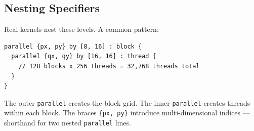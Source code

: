 \subsection*{Nesting Specifiers}

Real kernels nest these levels. A common pattern:

\begin{lstlisting}[language=croqtile,caption={Nesting Specifiers}]
parallel {px, py} by [8, 16] : block {
  parallel {qx, qy} by [16, 16] : thread {
    // 128 blocks x 256 threads = 32,768 threads total
  }
}
\end{lstlisting}

The outer \texttt{parallel} creates the block grid. The inner \texttt{parallel} creates threads within each block. The braces \texttt{\{px, py\}} introduce multi-dimensional indices --- shorthand for two nested \texttt{parallel} lines.
